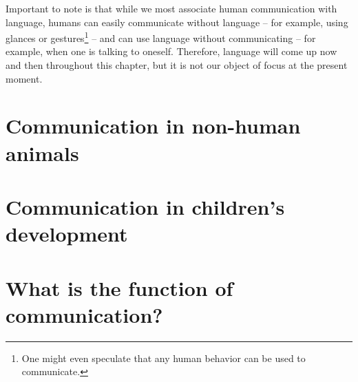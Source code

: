 Important to note is that while we most associate human communication with language, humans can easily communicate without language -- for example, using glances or gestures\footnote{One might even speculate that any human behavior can be used to communicate.} -- and can use language without communicating -- for example, when one is talking to oneself. Therefore, language will come up now and then throughout this chapter, but it is not our object of focus at the present moment.

\section{Communication in non-human animals}
\label{sec:comm:phylogeny}

\section{Communication in children's development}
\label{sec:comm:ontogeny}

\section{What is the function of communication?}
\label{sec:comm:function}
